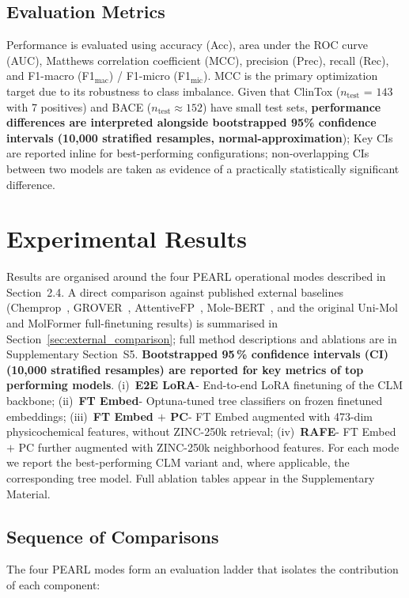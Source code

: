 \documentclass[pdflatex,sn-mathphys-num]{sn-jnl}%
\theoremstyle{thmstyleone}%
\theoremstyle{thmstyletwo}%
\theoremstyle{thmstylethree}%
\begin{document}
\subsection{Evaluation Metrics} \label{metrics}
Performance is evaluated using accuracy (Acc), area under the ROC curve (AUC), Matthews correlation coefficient (MCC), precision (Prec), recall (Rec), and F1-macro (F1$_\text{mac}$) / F1-micro (F1$_\text{mic}$). MCC is the primary optimization target due to its robustness to class imbalance. %
Given that ClinTox ($n_\text{test}$ = $143$ with 7 positives) and BACE ($n_\text{test} \approx 152$) have small test sets, \textbf{performance differences are interpreted alongside bootstrapped 95\% confidence intervals (10{,}000 stratified resamples, normal-approximation}); Key CIs are reported inline for best-performing configurations; non-overlapping CIs between two models are taken as evidence of a practically statistically significant difference.

\section{Experimental Results} \label{experimental_results}
Results are organised around the four PEARL operational modes described in Section~2.4. A direct comparison against published external baselines (Chemprop~\cite{yang2019chemprop}, GROVER~\cite{rong2020grover}, AttentiveFP~\cite{xiong2020attentivefp}, Mole-BERT~\cite{xia2023molecbert}, and the original Uni-Mol and MolFormer full-finetuning results) is summarised in Section~\ref{sec:external_comparison}; full method descriptions and ablations are in Supplementary Section~S5. \textbf{Bootstrapped 95\,\% confidence intervals (CI) (10{,}000 stratified resamples) are reported for key metrics of top performing models}.
(i)~\textbf{E2E LoRA}- End-to-end LoRA finetuning of the CLM backbone; 
(ii)~\textbf{FT Embed}- Optuna-tuned tree classifiers on frozen finetuned embeddings;
(iii)~\textbf{FT Embed $+$ PC}- FT Embed augmented with 473-dim physicochemical features, without ZINC-250k retrieval;
(iv)~\textbf{RAFE}- FT Embed $+$ PC further augmented with ZINC-250k neighborhood features. For each mode we report the best-performing CLM variant and, where applicable, the corresponding tree model. Full ablation tables appear in the Supplementary Material.

\subsection{Sequence of Comparisons}\label{sec:comparison_sequence}
The four PEARL modes form an evaluation ladder that isolates the contribution of each component:
\end{document}
